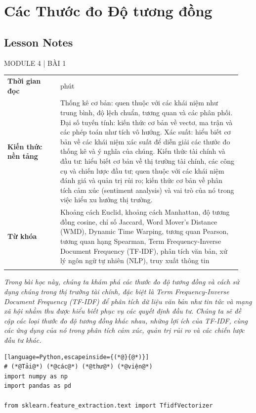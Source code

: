 \chapter{Các Thước đo Độ tương đồng}
\label{ch:M4L1}


\section*{Lesson Notes}

MODULE 4 | BÀI 1

{\small
\begin{longtable}{>{\raggedright\arraybackslash}p{0.213\linewidth}>{\raggedright\arraybackslash}p{0.727\linewidth}}
\toprule
\textbf{Thời gian đọc} & 45 phút \\
\addlinespace[2pt]
\textbf{Kiến thức nền tảng} & Thống kê cơ bản: quen thuộc với các khái niệm như trung bình, độ lệch chuẩn, tương quan và các phân phối. Đại số tuyến tính: kiến thức cơ bản về vectơ, ma trận và các phép toán như tích vô hướng. Xác suất: hiểu biết cơ bản về các khái niệm xác suất để diễn giải các thước đo thống kê và ý nghĩa của chúng. Kiến thức tài chính và đầu tư: hiểu biết cơ bản về thị trường tài chính, các công cụ và chiến lược đầu tư; quen thuộc với các khái niệm đánh giá và quản trị rủi ro; kiến thức cơ bản về phân tích cảm xúc (sentiment analysis) và vai trò của nó trong việc hiểu xu hướng thị trường. \\
\addlinespace[2pt]
\textbf{Từ khóa} & Khoảng cách Euclid, khoảng cách Manhattan, độ tương đồng cosine, chỉ số Jaccard, Word Mover's Distance (WMD), Dynamic Time Warping, tương quan Pearson, tương quan hạng Spearman, Term Frequency-Inverse Document Frequency (TF-IDF), phân tích văn bản, xử lý ngôn ngữ tự nhiên (NLP), truy xuất thông tin \\
\addlinespace[2pt]
\bottomrule
\end{longtable}
}

\emph{Trong bài học này, chúng ta khám phá các thước đo độ tương đồng và cách sử dụng chúng trong thị trường tài chính, đặc biệt là Term Frequency-Inverse Document Frequency (TF-IDF) để phân tích dữ liệu văn bản như tin tức và mạng xã hội nhằm thu được hiểu biết phục vụ các quyết định đầu tư. Chúng ta sẽ đề cập các loại thước đo độ tương đồng khác nhau, những lợi ích của TF-IDF, cùng các ứng dụng của nó trong phân tích cảm xúc, quản trị rủi ro và các chiến lược đầu tư khác.}

\begin{lstlisting}[language=Python,escapeinside={(*@}{@*)}]
# (*@Tải@*) (*@các@*) (*@thư@*) (*@viện@*)
import numpy as np
import pandas as pd

from sklearn.feature_extraction.text import TfidfVectorizer
\end{lstlisting}

